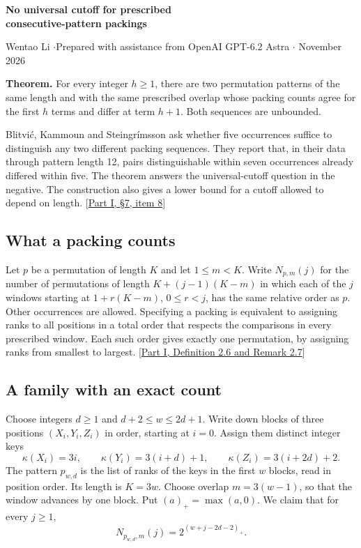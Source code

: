 \documentclass[11pt]{article}
\newcommand{\pos}[1]{(#1)_{+}}
\newcommand{\sourcepaper}{\href{https://arxiv.org/html/2610.29846v1\#S7}{Part I, \S7, item 8}}
\begin{document}
\begin{center}
{\Large\bfseries No universal cutoff for prescribed\\[2pt] consecutive-pattern packings}\par
\small Wentao Li \enspace$\cdot$\enspace Prepared with assistance from OpenAI GPT-6.2 Astra \enspace$\cdot$ November 2026
\end{center}

\textbf{Theorem.}
For every integer $h\ge1$, there are two permutation patterns of the same length and with the same prescribed overlap whose packing counts agree for the first $h$ terms and differ at term $h+1$. Both sequences are unbounded.

Blitvi\'c, Kammoun and Steingr\'imsson ask whether five occurrences suffice to distinguish any two different packing sequences. They report that, in their data through pattern length 12, pairs distinguishable within seven occurrences already differed within five. The theorem answers the universal-cutoff question in the negative. The construction also gives a lower bound for a cutoff allowed to depend on length. [\sourcepaper]

\subsection*{What a packing counts}
Let $p$ be a permutation of length $K$ and let $1\le m<K$. Write $N_{p,m}(j)$ for the number of permutations of length $K+(j-1)(K-m)$ in which each of the $j$ windows starting at $1+r(K-m)$, $0\le r<j$, has the same relative order as $p$. Other occurrences are allowed. Specifying a packing is equivalent to assigning ranks to all positions in a total order that respects the comparisons in every prescribed window. Each such order gives exactly one permutation, by assigning ranks from smallest to largest. [\href{https://arxiv.org/html/2610.29846v1\#S2.SS1}{Part I, Definition 2.6 and Remark 2.7}]

\subsection*{A family with an exact count}
Choose integers $d\ge1$ and $d+2\le w\le2d+1$. Write down blocks of three positions $(X_i,Y_i,Z_i)$ in order, starting at $i=0$. Assign them distinct integer keys
\[
    \kappa(X_i)=3i,\qquad \kappa(Y_i)=3(i+d)+1,\qquad \kappa(Z_i)=3(i+2d)+2 .
\]
The pattern $p_{w,d}$ is the list of ranks of the keys in the first $w$ blocks, read in position order. Its length is $K=3w$. Choose overlap $m=3(w-1)$, so that the window advances by one block. Put $(a)_+=\max(a,0)$. We claim that for every $j\ge1$,
\begin{equation}
   N_{p_{w,d},m}(j)=2^{\pos{w+j-2d-2}}.\label{eq:counts}
\end{equation}
\end{document}
